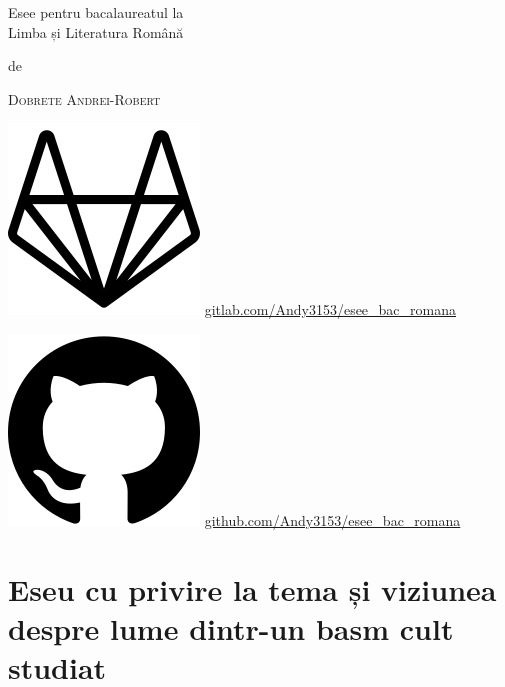 \documentclass[
 12pt,                       %
 a4paper                     %
]{book}
\begin{document}
\pagestyle{empty}
\begin{titlepage}
 \centering
 \vspace*{1cm}
 \vspace{4\baselineskip}
 {\Huge
 Esee pentru bacalaureatul la \\ Limba și Literatura Română\par}
 \vspace{4\baselineskip}
 de\par
 {\Large\textsc{Dobrete Andrei-Robert}\par}
 \vfill
 \includegraphics[height=\fontcharht\font`\B]{gitlab}
 \url{gitlab.com/Andy3153/esee_bac_romana}\par
 \includegraphics[height=\fontcharht\font`\B]{github}
 \url{github.com/Andy3153/esee_bac_romana}\par
 \vspace{1.5\baselineskip}
 {\large\LaTeXe}
\end{titlepage}

\tableofcontents

\pagestyle{plain}



\chapter{Eseu cu privire la tema și viziunea despre lume dintr-un basm cult studiat}

\end{document}
